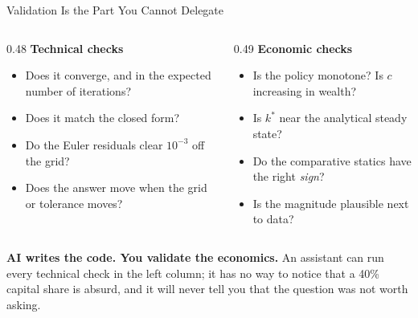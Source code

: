 \begin{frame}{Validation Is the Part You Cannot Delegate}
\begin{columns}[T]
\begin{column}{0.48\textwidth}
\small
\textbf{Technical checks}
\begin{itemize}\footnotesize
  \item Does it converge, and in the expected number of iterations?
  \item Does it match the closed form?
  \item Do the Euler residuals clear $10^{-3}$ off the grid?
  \item Does the answer move when the grid or tolerance moves?
\end{itemize}
\end{column}
\begin{column}{0.49\textwidth}
\small
\textbf{Economic checks}
\begin{itemize}\footnotesize
  \item Is the policy monotone? Is $c$ increasing in wealth?
  \item Is $k^*$ near the analytical steady state?
  \item Do the comparative statics have the right \emph{sign}?
  \item Is the magnitude plausible next to data?
\end{itemize}
\end{column}
\end{columns}
\vspace{1mm}
\begin{takeawaybox}\small
\textbf{AI writes the code. You validate the economics.} An assistant can run every technical check in the left column; it has no way to notice that a 40\% capital share is absurd, and it will never tell you that the question was not worth asking.
\end{takeawaybox}
\vspace{1mm}
\end{frame}

